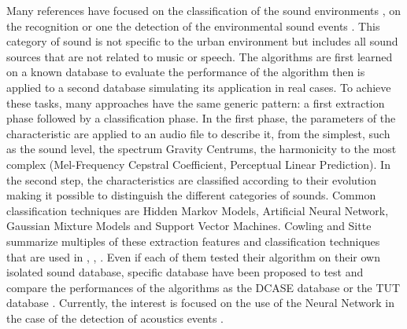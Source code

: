 \documentclass[twocolumn,a4paper,10pt]{article}
\begin{document}
Many references have focused on the classification of the sound environments \cite{allegro_automatic_2001}, on the recognition \cite{defreville_automatic_2006} or one the detection of the  environmental sound events \cite{heittola_sound_2011}. This category of sound is not specific to the urban environment but includes all sound sources that are not related to music or speech. The algorithms are first learned on a known database to evaluate the performance of the algorithm then is applied to a second database simulating its application in real cases. To achieve these tasks, many approaches have the same generic pattern: a first extraction phase followed by a classification phase. In the first phase, the parameters of the characteristic are applied to an audio file to describe it, from the simplest, such as the sound level, the spectrum Gravity Centrums, the harmonicity to the most complex (Mel-Frequency Cepstral Coefficient, Perceptual Linear Prediction). In the second step, the characteristics are classified according to their evolution making it possible to distinguish the different categories of sounds. Common classification techniques are Hidden Markov Models, Artificial Neural Network, Gaussian Mixture Models and Support Vector Machines. Cowling and Sitte \cite{cowling_comparison_2003} summarize multiples of these extraction features and classification techniques that are used in \cite{shen_environmental_2012}, \cite{beritelli_pattern_2008}, \cite{couvreur_automatic_2004}. Even if each of them tested their algorithm on their own isolated sound database, specific database have been proposed to test and compare the performances of the algorithms as the DCASE database \cite{giannoulis_database_2013} or the TUT database \cite{mesaros_tut_2016}. Currently, the interest is focused on the use of the Neural Network in the case of the detection of acoustics events \cite{genaro_neural_2010} \cite{parascandolo_recurrent_2016}. 
\end{document}
